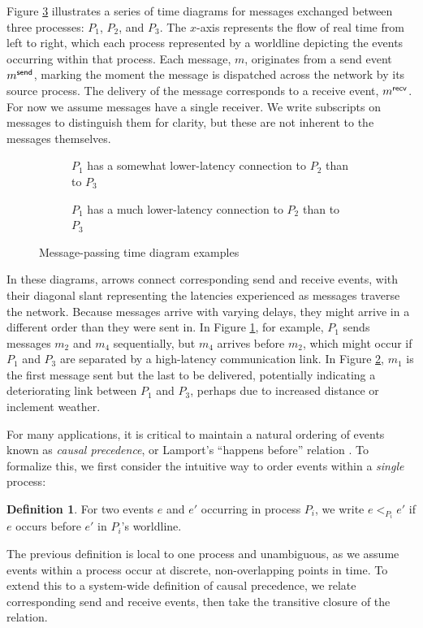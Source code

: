 \documentclass[]             %
{NASA}                       %
\theoremstyle{definition}
\newtheorem{definition}[theorem]{Definition}
\begin{document}
Figure \ref{fig:message-latencies} illustrates a series of time
diagrams for messages exchanged between three processes: $P_1$, $P_2$,
and $P_3$. The $x$-axis represents the flow of real time from left to
right, which each process represented by a worldline depicting the
events occurring within that process. Each message, $m$, originates
from a send event $m_{}^{\mathsf{send}}$, marking the moment the message is
dispatched across the network by its source process. The delivery of
the message corresponds to a receive event, $m_{}^{\mathsf{recv}}$. For now we
assume messages have a single receiver. We write subscripts on
messages to distinguish them for clarity, but these are not inherent
to the messages themselves.

\begin{figure}[p]
  \setlength\belowcaptionskip{5ex}
  \begin{subfigure}{1\textwidth}
    \centering
    
    \caption{$P_1$ has a somewhat lower-latency connection to $P_2$ than to $P_3$}
    \label{fig:message-latencies-a}
  \end{subfigure}
  \begin{subfigure}{1\textwidth}
    \centering 
    \caption{$P_1$ has a much lower-latency connection to $P_2$ than to $P_3$}
    \label{fig:message-latencies-b}
  \end{subfigure}
  \caption{Message-passing time diagram examples}
  \label{fig:message-latencies}
\end{figure}

In these diagrams, arrows connect corresponding send and receive
events, with their diagonal slant representing the latencies
experienced as messages traverse the network. Because messages arrive
with varying delays, they might arrive in a different order than they
were sent in. In Figure \ref{fig:message-latencies-a}, for example,
$P_1$ sends messages $m_2$ and $m_4$ sequentially, but $m_4$ arrives
before $m_2$, which might occur if $P_1$ and $P_3$ are separated by a
high-latency communication link. In Figure
\ref{fig:message-latencies-b}, $m_1$ is the first message sent but the
last to be delivered, potentially indicating a deteriorating link
between $P_1$ and $P_3$, perhaps due to increased distance or
inclement weather.

For many applications, it is critical to maintain a natural ordering
of events known as \emph{causal precedence}, or Lamport's ``happens
before'' relation \cite{1978:lamportclocks}. To formalize this, we
first consider the intuitive way to order events within a
\emph{single} process:
\begin{definition}
  For two events $e$ and $e'$ occurring in process $P_i$, we
  write $e <_{P_i} e'$ if $e$ occurs before $e'$ in $P_i$'s
  worldline.
\end{definition}
The previous definition is local to one process and unambiguous, as we
assume events within a process occur at discrete, non-overlapping
points in time. To extend this to a system-wide definition of causal
precedence, we relate corresponding send and receive events, then take
the transitive closure of the relation.
\end{document}
